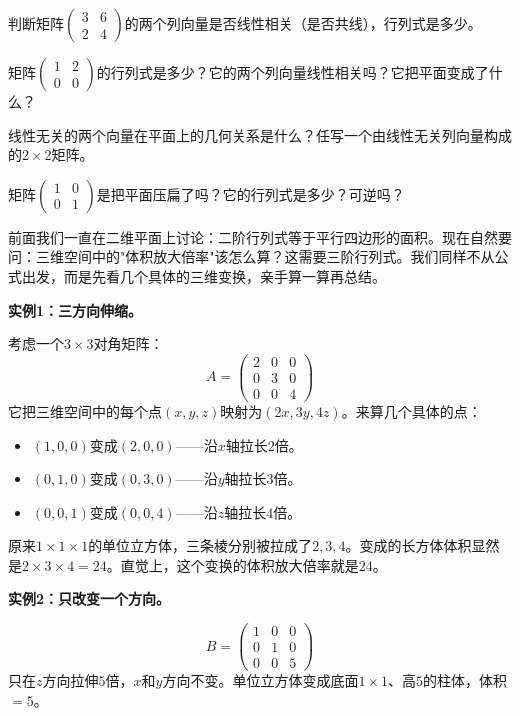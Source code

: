 \begin{exercise}
\item 判断矩阵$\begin{pmatrix}3&6\\2&4\end{pmatrix}$的两个列向量是否线性相关（是否共线），行列式是多少。
\item 矩阵$\begin{pmatrix}1&2\\0&0\end{pmatrix}$的行列式是多少？它的两个列向量线性相关吗？它把平面变成了什么？
\item 线性无关的两个向量在平面上的几何关系是什么？任写一个由线性无关列向量构成的$2\times2$矩阵。
\item 矩阵$\begin{pmatrix}1&0\\0&1\end{pmatrix}$是把平面压扁了吗？它的行列式是多少？可逆吗？
\end{exercise}


前面我们一直在二维平面上讨论：二阶行列式等于平行四边形的面积。现在自然要问：三维空间中的"体积放大倍率"该怎么算？这需要三阶行列式。我们同样不从公式出发，而是先看几个具体的三维变换，亲手算一算再总结。

\vspace{0.2cm}
\noindent\textbf{实例1：三方向伸缩。}

考虑一个$3\times3$对角矩阵：
\[
A = \begin{pmatrix}2&0&0\\0&3&0\\0&0&4\end{pmatrix}
\]
它把三维空间中的每个点$(x,y,z)$映射为$(2x,3y,4z)$。来算几个具体的点：
\begin{itemize}
\item $(1,0,0)$变成$(2,0,0)$——沿$x$轴拉长$2$倍。
\item $(0,1,0)$变成$(0,3,0)$——沿$y$轴拉长$3$倍。
\item $(0,0,1)$变成$(0,0,4)$——沿$z$轴拉长$4$倍。
\end{itemize}
原来$1\times1\times1$的单位立方体，三条棱分别被拉成了$2,3,4$。变成的长方体体积显然是$2\times3\times4=24$。直觉上，这个变换的体积放大倍率就是$24$。

\vspace{0.2cm}
\noindent\textbf{实例2：只改变一个方向。}

\[
B = \begin{pmatrix}1&0&0\\0&1&0\\0&0&5\end{pmatrix}
\]
只在$z$方向拉伸$5$倍，$x$和$y$方向不变。单位立方体变成底面$1\times1$、高$5$的柱体，体积$=5$。

